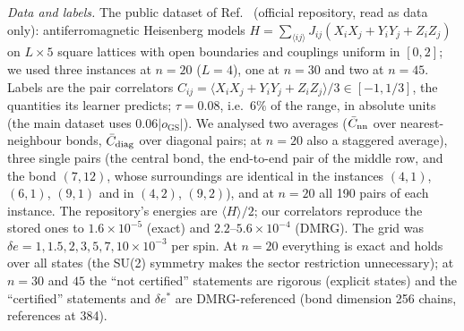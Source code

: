 \documentclass[aps,prx,onecolumn,10pt,nofootinbib,longbibliography,floatfix]{revtex4-2}
\theoremstyle{remark}
\newcommand{\de}{\delta e}
\newcommand{\des}{\delta e^{*}}
\newcommand{\GS}{\mathrm{GS}}
\begin{document}
\emph{Data and labels.} The public dataset of Ref.~\cite{huang2022} (official repository, read as data only): %
antiferromagnetic Heisenberg models $H=\sum_{\langle ij\rangle}J_{ij}(X_iX_j+Y_iY_j+Z_iZ_j)$ on $L\times5$ square lattices %
with open boundaries and couplings uniform in $[0,2]$; we used three instances at $n=20$ ($L=4$), one at $n=30$ and two at %
$n=45$. Labels are the pair correlators $C_{ij}=\langle X_iX_j+Y_iY_j+Z_iZ_j\rangle/3\in[-1,1/3]$, the quantities its %
learner predicts; $\tau=0.08$, i.e.\ $6\%$ of the range, in absolute units (the main dataset uses $0.06|o_\GS|$). We analysed two averages ($\bar C_{\rm nn}$ over nearest-neighbour %
bonds, $\bar C_{\rm diag}$ over diagonal pairs; at $n=20$ also a staggered average), three single pairs (the central %
bond, the end-to-end pair of the middle row, and the bond $(7,12)$, whose surroundings are identical in the instances %
$(4,1)$, $(6,1)$, $(9,1)$ and in $(4,2)$, $(9,2)$), and at $n=20$ all 190 pairs of each instance. The repository's %
energies are $\langle H\rangle/2$; our correlators reproduce the stored ones to $1.6\times10^{-5}$ (exact) and %
$2.2$--$5.6\times10^{-4}$ (DMRG). The grid was $\de=1,1.5,2,3,5,7,10\times10^{-3}$ per spin. At $n=20$ everything is %
exact and holds over all states (the SU(2) symmetry makes the sector restriction unnecessary); at $n=30$ and $45$ the %
``not certified'' statements are rigorous (explicit states) and the ``certified'' statements and $\des$ are
DMRG-referenced (bond dimension 256 chains, references at 384). %
\end{document}
